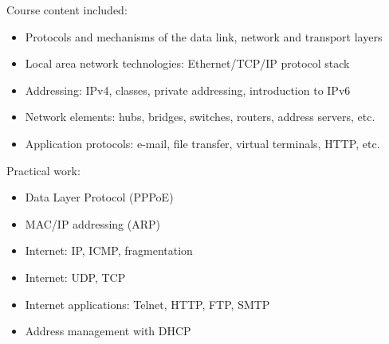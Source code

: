 Course content included:
\begin{itemize}
    \item Protocols and mechanisms of the data link, network and transport layers
    \item Local area network technologies: Ethernet/TCP/IP protocol stack
    \item Addressing: IPv4, classes, private addressing, introduction to IPv6
    \item Network elements: hubs, bridges, switches, routers, address servers, etc.
    \item Application protocols: e-mail, file transfer, virtual terminals, HTTP, etc.
\end{itemize}
Practical work:
\begin{itemize}
    \item Data Layer Protocol (PPPoE)
    \item MAC/IP addressing (ARP)
    \item Internet: IP, ICMP, fragmentation
    \item Internet: UDP, TCP
    \item Internet applications: Telnet, HTTP, FTP, SMTP
    \item Address management with DHCP
\end{itemize}